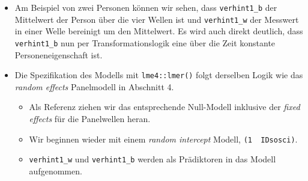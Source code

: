 \documentclass[
]{book}
\newenvironment{Shaded}{\begin{snugshade}}{\end{snugshade}}
\newcommand{\CommentTok}[1]{\textcolor[rgb]{0.56,0.35,0.01}{\textit{#1}}}
\newcommand{\DataTypeTok}[1]{\textcolor[rgb]{0.13,0.29,0.53}{#1}}
\newcommand{\DecValTok}[1]{\textcolor[rgb]{0.00,0.00,0.81}{#1}}
\newcommand{\KeywordTok}[1]{\textcolor[rgb]{0.13,0.29,0.53}{\textbf{#1}}}
\newcommand{\NormalTok}[1]{#1}
\newcommand{\OperatorTok}[1]{\textcolor[rgb]{0.81,0.36,0.00}{\textbf{#1}}}
\newcommand{\OtherTok}[1]{\textcolor[rgb]{0.56,0.35,0.01}{#1}}
\newcommand{\StringTok}[1]{\textcolor[rgb]{0.31,0.60,0.02}{#1}}
\providecommand{\tightlist}{%
  \setlength{\itemsep}{0pt}\setlength{\parskip}{0pt}}
\begin{document}
\begin{itemize}
\item
  Am Beispiel von zwei Personen können wir sehen, dass \texttt{verhint1\_b} der Mittelwert der Person über die vier Wellen ist und \texttt{verhint1\_w} der Messwert in einer Welle bereinigt um den Mittelwert. Es wird auch direkt deutlich, dass \texttt{verhint1\_b} nun per Transformationslogik eine über die Zeit konstante Personeneigenschaft ist.
\item
  Die Spezifikation des Modells mit \texttt{lme4::lmer()} folgt derselben Logik wie das \emph{random effects} Panelmodell in Abschnitt 4.

  \begin{itemize}
  \tightlist
  \item
    Als Referenz ziehen wir das entsprechende Null-Modell inklusive der \emph{fixed effects} für die Panelwellen heran.
  \item
    Wir beginnen wieder mit einem \emph{random intercept} Modell, \texttt{(1\ \textbar{}\ IDsosci)}.
  \item
    \texttt{verhint1\_w} und \texttt{verhint1\_b} werden als Prädiktoren in das Modell aufgenommen.
  \end{itemize}
\end{itemize}

\begin{Shaded}
\end{Shaded}
\end{document}
